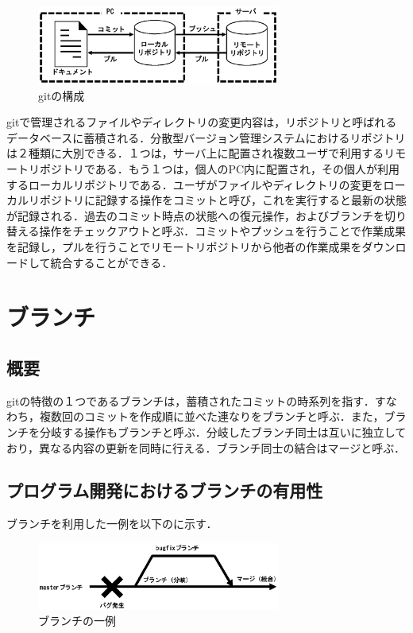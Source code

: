 \documentclass[a4j,9pt,twocolumn]{jsarticle}
\begin{document}
\begin{figure}[h]
\centering
\includegraphics[width=80mm]{img/git.eps}
\caption{gitの構成}
\label{git}
\end{figure}

gitで管理されるファイルやディレクトリの変更内容は，リポジトリと呼ばれるデータベースに蓄積される．分散型バージョン管理システムにおけるリポジトリは２種類に大別できる．１つは，サーバ上に配置され複数ユーザで利用するリモートリポジトリである．もう１つは，個人のPC内に配置され，その個人が利用するローカルリポジトリである．ユーザがファイルやディレクトリの変更をローカルリポジトリに記録する操作をコミットと呼び，これを実行すると最新の状態が記録される．過去のコミット時点の状態への復元操作，およびブランチを切り替える操作をチェックアウトと呼ぶ．コミットやプッシュを行うことで作業成果を記録し，プルを行うことでリモートリポジトリから他者の作業成果をダウンロードして統合することができる．

\section{ブランチ}
\subsection{概要}
gitの特徴の１つであるブランチは，蓄積されたコミットの時系列を指す．すなわち，複数回のコミットを作成順に並べた連なりをブランチと呼ぶ．また，ブランチを分岐する操作もブランチと呼ぶ．分岐したブランチ同士は互いに独立しており，異なる内容の更新を同時に行える．ブランチ同士の結合はマージと呼ぶ．

\subsection{プログラム開発におけるブランチの有用性}
ブランチを利用した一例を以下のに示す．

\begin{figure}[h]
\centering
\includegraphics[width=80mm]{img/branch.eps}
\caption{ブランチの一例}
\label{branch_ex}
\end{figure}
\end{document}
